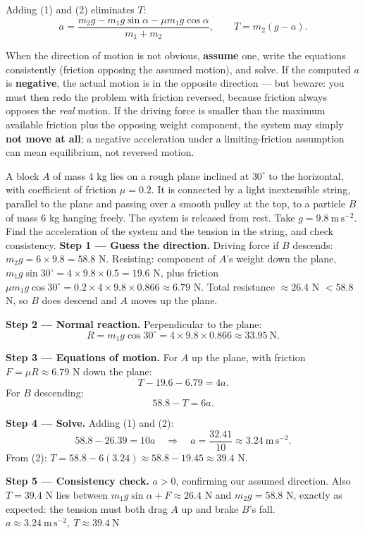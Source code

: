 \documentclass[11pt]{article}
\begin{document}
Adding (1) and (2) eliminates $T$:
\[
a = \frac{m_2 g - m_1 g\sin\alpha - \mu m_1 g\cos\alpha}{m_1 + m_2},
\qquad
T = m_2(g - a).
\]

\begin{attention}
When the direction of motion is not obvious, \textbf{assume} one, write the equations consistently (friction opposing the assumed motion), and solve. If the computed $a$ is \textbf{negative}, the actual motion is in the opposite direction — but beware: you must then redo the problem with friction reversed, because friction always opposes the \emph{real} motion. If the driving force is smaller than the maximum available friction plus the opposing weight component, the system may simply \textbf{not move at all}; a negative acceleration under a limiting-friction assumption can mean equilibrium, not reversed motion.
\end{attention}

\begin{exoresolu}
A block $A$ of mass $4$ kg lies on a rough plane inclined at $30^{\circ}$ to the horizontal, with coefficient of friction $\mu = 0.2$. It is connected by a light inextensible string, parallel to the plane and passing over a smooth pulley at the top, to a particle $B$ of mass $6$ kg hanging freely. The system is released from rest. Take $g = 9.8\ \mathrm{m\,s^{-2}}$. Find the acceleration of the system and the tension in the string, and check consistency.
\tcblower
\textbf{Step 1 — Guess the direction.} Driving force if $B$ descends: $m_2 g = 6 \times 9.8 = 58.8$ N. Resisting: component of $A$'s weight down the plane, $m_1 g\sin 30^{\circ} = 4 \times 9.8 \times 0.5 = 19.6$ N, plus friction $\mu m_1 g\cos 30^{\circ} = 0.2 \times 4 \times 9.8 \times 0.866 \approx 6.79$ N. Total resistance $\approx 26.4$ N $< 58.8$ N, so $B$ does descend and $A$ moves up the plane.

\textbf{Step 2 — Normal reaction.} Perpendicular to the plane:
\[
R = m_1 g\cos 30^{\circ} = 4 \times 9.8 \times 0.866 \approx 33.95\ \mathrm{N}.
\]

\textbf{Step 3 — Equations of motion.} For $A$ up the plane, with friction $F = \mu R \approx 6.79$ N down the plane:
\[
T - 19.6 - 6.79 = 4a. \tag{1}
\]
For $B$ descending:
\[
58.8 - T = 6a. \tag{2}
\]

\textbf{Step 4 — Solve.} Adding (1) and (2):
\[
58.8 - 26.39 = 10a \quad\Longrightarrow\quad a = \frac{32.41}{10} \approx 3.24\ \mathrm{m\,s^{-2}}.
\]
From (2): $T = 58.8 - 6(3.24) \approx 58.8 - 19.45 \approx 39.4$ N.

\textbf{Step 5 — Consistency check.} $a > 0$, confirming our assumed direction. Also $T = 39.4$ N lies between $m_1 g\sin\alpha + F \approx 26.4$ N and $m_2 g = 58.8$ N, exactly as expected: the tension must both drag $A$ up and brake $B$'s fall. $\boxed{a \approx 3.24\ \mathrm{m\,s^{-2}},\ T \approx 39.4\ \mathrm{N}}$
\end{exoresolu}
\end{document}
